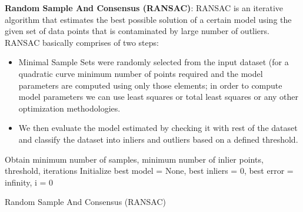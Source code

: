 \documentclass{article}
\begin{document}
\newline \textbf{Random Sample And Consensus (RANSAC)}:
\newline
RANSAC is an iterative algorithm that estimates the best possible solution of a certain model using the given set of data points that is contaminated by large number of outliers. RANSAC basically comprises of two steps:
\begin{itemize}
    \item Minimal Sample Sets were randomly selected from the input dataset (for a quadratic curve minimum number of points required and the model parameters are computed using only those elements; in order to compute model parameters we can use least squares or total least squares or any other optimization methodologies.
    \item We then evaluate the model estimated by checking it with rest of the dataset and classify the dataset into inliers and outliers based on a defined threshold.
\end{itemize}
\begin{algorithm}[H]
\SetAlgoLined
{}
 Obtain minimum number of samples, minimum number of inlier points, threshold, iterations\;
 Initialize best model = None, best inliers = 0, best error = infinity, i = 0\;
 \caption{Random Sample And Consensus (RANSAC)}
\end{algorithm}
\end{document}

